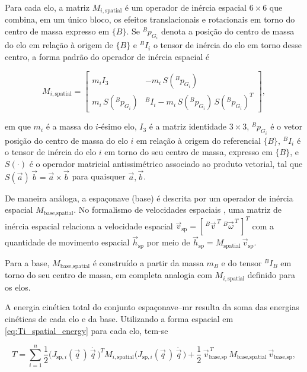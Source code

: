 Para cada elo, a matriz $M_{i,\text{spatial}}$ é um operador de inércia
espacial $6\times 6$ que combina, em um único bloco, os efeitos
translacionais e rotacionais em torno do centro de massa expresso em
$\{B\}$.
Se ${}^{B}\!p_{G_i}$ denota a posição do centro de massa do elo em relação à
origem de $\{B\}$ e ${}^{B}\!I_i$ o tensor de inércia do elo em torno desse
centro, a forma padrão do operador de inércia espacial é

\begin{equation}
M_{i,\text{spatial}}
=
\begin{bmatrix}
m_i I_3 & -m_i\,S({}^{B}\!p_{G_i})\\[2pt]
m_i\,S({}^{B}\!p_{G_i}) &
{}^{B}\!I_i - m_i\,S({}^{B}\!p_{G_i})\,S({}^{B}\!p_{G_i})^{T}
\end{bmatrix},
\end{equation}

em que $m_i$ é a massa do $i$-ésimo elo, $I_3$ é a matriz identidade $3\times 3$,
${}^{B}\!p_{G_i}$ é o vetor posição do centro de massa do elo $i$
em relação à origem do referencial $\{B\}$, ${}^{B}\!I_i$
é o tensor de inércia do elo $i$ em torno do seu centro de massa, expresso em
$\{B\}$, e $S(\cdot)$ é o operador matricial antissimétrico associado ao produto
vetorial, tal que $S(\vec a)\,\vec b = \vec a \times \vec b$ para quaisquer
$\vec a,\vec b$.

De maneira análoga, a espaçonave (base) é descrita por um operador de inércia
espacial $M_{\text{base},\text{spatial}}$.
No formalismo de velocidades espaciais \cite{featherstone2008}, uma matriz de
inércia espacial relaciona a velocidade espacial
$\vec v_{\text{sp}} = [\,{}^{B}\!\vec v^{\,T}\;{}^{B}\!\vec\omega^{\,T}\,]^{T}$
com a quantidade de movimento espacial
$\vec h_{\text{sp}}$ por meio de
$\vec h_{\text{sp}} = M_{\text{spatial}}\,\vec v_{\text{sp}}$.

Para a base, $M_{\text{base},\text{spatial}}$ é construído a partir da massa
$m_B$ e do tensor ${}^{B}\!I_B$ em torno do seu centro de massa, em completa
analogia com $M_{i,\text{spatial}}$ definido para os elos.

A energia cinética total do conjunto espaçonave--\gls{mr} resulta da soma das
energias cinéticas de cada elo e da base.
Utilizando a forma espacial em \eqref{eq:Ti_spatial_energy} para cada elo,
tem-se

\begin{equation}
T
=
\sum_{i=1}^{n}
\frac{1}{2}
\bigl(J_{\text{sp},i}(\vec q\, )\,\dot{\vec q\, }\bigr)^{T}
M_{i,\text{spatial}}
\bigl(J_{\text{sp},i}(\vec q\, )\,\dot{\vec q\, }\bigr)
+
\frac{1}{2}\,
\vec v_{\text{base,sp}}^{\,T}\,
M_{\text{base},\text{spatial}}\,
\vec v_{\text{base,sp}},
\end{equation}

